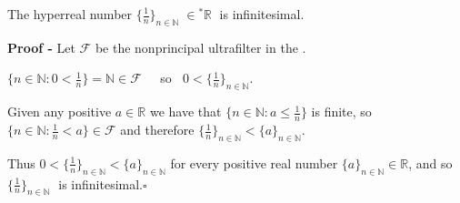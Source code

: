 \documentclass[12pt]{article}
\begin{document}
The hyperreal number $\{\frac{1}{n}\}_{n \in \mathbb{N}}\; \in {}^*\mathbb{R}\;$ is infinitesimal.

{\bf Proof -} Let $\mathcal{F}$ be the nonprincipal ultrafilter  in the  .

$\{n \in \mathbb{N} : 0 < \frac{1}{n}\} = \mathbb{N} \in \mathcal{F}\;\;\;\;$ so $\;\;0 < \{\frac{1}{n}\}_{n \in \mathbb{N}}$.

Given any positive $a \in \mathbb{R}$ we have that $\{n \in \mathbb{N} : a \leq \frac{1}{n}\}$ is finite,
 so $\{n \in \mathbb{N} : \frac{1}{n} < a\} \in \mathcal{F}$ and therefore $\{\frac{1}{n}\}_{n \in \mathbb{N}} < \{a\}_{n \in \mathbb{N}}$.

Thus $0 < \{\frac{1}{n}\}_{n \in \mathbb{N}} < \{a\}_{n \in \mathbb{N}}$ for every positive real number $\{a\}_{n \in \mathbb{N}} \in \mathbb{R}$, and so $\{\frac{1}{n}\}_{n \in \mathbb{N}}\;$ is infinitesimal.$\square$
\end{document}
